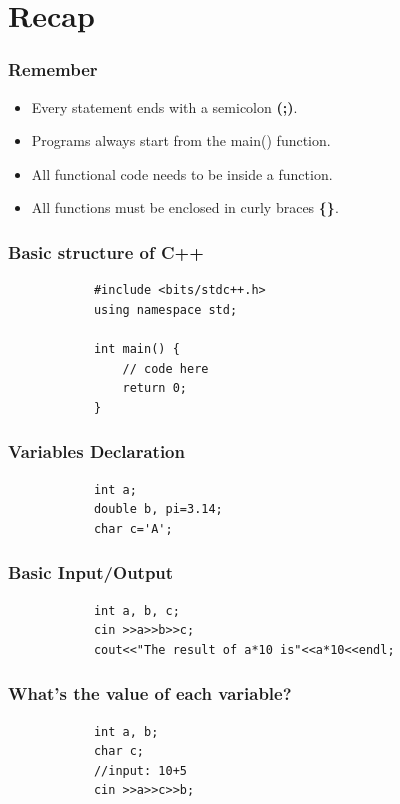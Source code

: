 \documentclass[xcolor=dvipsnames]{beamer}
\begin{document}
    \section{Recap}
    \begin{frame}
        \frametitle{Remember}
        \begin{itemize}
            \item Every statement ends with a semicolon \textbf{(;)}.
            \item Programs always start from the \alert{main()} function.
            \item All functional code needs to be inside a function.
            \item All functions must be enclosed in curly braces \textbf{\{\}}.
        \end{itemize}
    \end{frame}
    \begin{frame}[fragile]
        \frametitle{Basic structure of C++}
        \begin{verbatim}
            #include <bits/stdc++.h>
            using namespace std;

            int main() {
                // code here
                return 0;
            }
        \end{verbatim}
    \end{frame}
    \begin{frame}[fragile]
        \frametitle{Variables Declaration}
        \begin{verbatim}
            int a;
            double b, pi=3.14;
            char c='A';
        \end{verbatim}
    \end{frame}
    \begin{frame}[fragile]
        \frametitle{Basic Input/Output}
        \begin{verbatim}
            int a, b, c;
            cin >>a>>b>>c;
            cout<<"The result of a*10 is"<<a*10<<endl;
        \end{verbatim}
    \end{frame}
    \begin{frame}[fragile]
        \frametitle{What's the value of each variable?}
        \begin{verbatim}
            int a, b;
            char c;
            //input: 10+5
            cin >>a>>c>>b;
        \end{verbatim}
    \end{frame}
\end{document}
